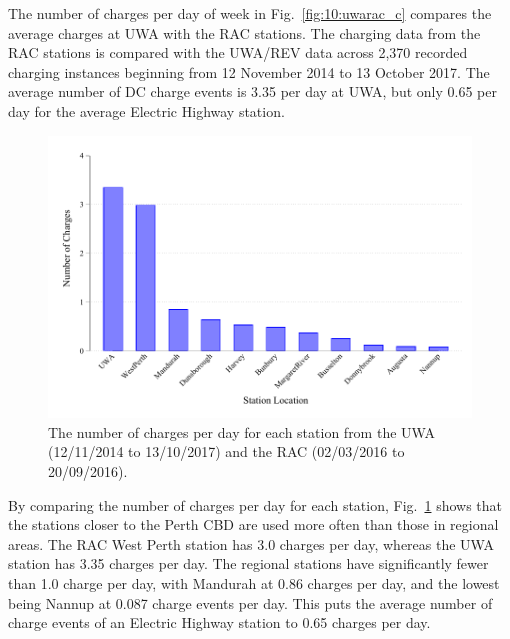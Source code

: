 The number of charges per day of week in Fig.~\ref{fig:10:uwarac_c} compares the average charges at UWA with the RAC stations. The charging data from the RAC stations is compared with the UWA/REV data across 2,370 recorded charging instances beginning from 12 November 2014 to 13 October 2017. The average number of DC charge events is 3.35 per day at UWA, but only 0.65 per day for the average Electric Highway station. 

\begin{figure}[H]
	\centering
	\includegraphics[width=0.8\linewidth]{dc_p}
	\caption[Number of charges per day for each station]{The number of charges per day for each station from the UWA (12/11/2014 to 13/10/2017) and the RAC (02/03/2016 to 20/09/2016).}
	\label{fig:10:dc_p}
\end{figure}

By comparing the number of charges per day for each station, Fig.~\ref{fig:10:dc_p} shows that the stations closer to the Perth CBD are used more often than those in regional areas. The RAC West Perth station has 3.0 charges per day, whereas the UWA station has 3.35 charges per day. The regional stations have significantly fewer than 1.0 charge per day, with Mandurah at 0.86 charges per day, and the lowest being Nannup at 0.087 charge events per day. This puts the average number of charge events of an Electric Highway station to 0.65 charges per day.


